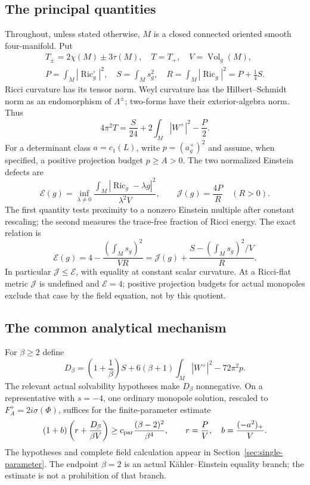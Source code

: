 \documentclass[10pt,a4paper]{article}
\theoremstyle{definition}
\theoremstyle{remark}
\numberwithin{equation}{section}
\providecommand{\Ric}{\operatorname{Ric}}
\providecommand{\Vol}{\operatorname{Vol}}
\providecommand{\E}{\mathcal E}
\providecommand{\J}{\mathcal J}
\begin{document}
\subsection{The principal quantities}
Throughout, unless stated otherwise, $M$ is a closed connected oriented
smooth four-manifold. Put
\[
 \begin{gathered}
 T_\pm=2\chi(M)\pm3\tau(M),\quad T=T_+,\quad V=\Vol_g(M),\\
 P=\int_M|\Ric_g^\circ|^2,\quad S=\int_Ms_g^2,
 \quad R=\int_M|\Ric_g|^2=P+\frac14S.
 \end{gathered}
\]
Ricci curvature has its tensor norm. Weyl curvature has the
Hilbert--Schmidt norm as an endomorphism of $\Lambda^\pm$; two-forms have
their exterior-algebra norm. Thus
\begin{equation}\label{eq:intro-cw}
 4\pi^2T=\frac{S}{24}+2\int_M|W^+|^2-\frac{P}{2}.
\end{equation}
For a determinant class $a=c_1(L)$, write $p=(a_g^+)^2$ and assume, when
specified, a positive projection budget $p\ge A>0$. The two normalized
Einstein defects are
\begin{equation}\label{eq:intro-defects}
 \E(g)=\inf_{\lambda\ne0}
 \frac{\int_M|\Ric_g-\lambda g|^2}{\lambda^2V},
 \qquad \J(g)=\frac{4P}{R}\quad(R>0).
\end{equation}
The first quantity tests proximity to a nonzero Einstein multiple after
constant rescaling; the second measures the trace-free fraction of Ricci
energy. The exact relation is
\[
 \E(g)=4-\frac{(\int_Ms_g)^2}{VR}
       =\J(g)+\frac{S-(\int_Ms_g)^2/V}{R}.
\]
In particular $\J\le\E$, with equality at constant scalar curvature.
At a Ricci-flat metric $\J$ is undefined and $\E=4$; positive projection
budgets for actual monopoles exclude that case by the field equation, not by this
quotient.

\subsection{The common analytical mechanism}
For $\beta\ge2$ define
\[
 D_\beta=\left(1+\frac1\beta\right)S
       +6(\beta+1)\int_M|W^+|^2-72\pi^2p.
\]
The relevant actual solvability hypotheses make $D_\beta$ nonnegative.
On a representative with $s=-4$, one ordinary monopole solution, rescaled
to $F_A^+=2i\sigma(\Phi)$, suffices for the finite-parameter estimate
\begin{equation}\label{eq:intro-parameter}
 (1+b)\left(r+\frac{D_\beta}{\beta V}\right)
 \ge c_{\rm par}\frac{(\beta-2)^2}{\beta^4},
 \qquad r=\frac{P}{V},\quad b=\frac{(-a^2)_+}{V}.
\end{equation}
The hypotheses and complete field calculation appear in
Section~\ref{sec:single-parameter}. The endpoint $\beta=2$ is an actual
Kähler--Einstein equality branch; the estimate is not a prohibition of
that branch.
\end{document}
